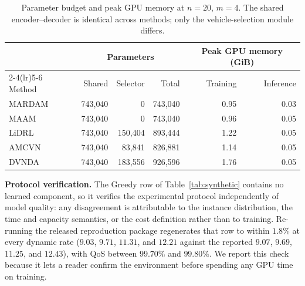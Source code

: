\begin{table}[t]
\centering
\caption{Parameter budget and peak GPU memory at $n=20$, $m=4$. The shared
encoder--decoder is identical across methods; only the vehicle-selection module
differs.}
\label{tab:budget}
\begin{tabular}{lrrrrr}
\toprule
& \multicolumn{3}{c}{Parameters} & \multicolumn{2}{c}{Peak GPU memory (GiB)} \\
\cmidrule(lr){2-4}\cmidrule(lr){5-6}
Method & Shared & Selector & Total & Training & Inference \\
\midrule
MARDAM & 743{,}040 & 0       & 743{,}040 & 0.95 & 0.03 \\
MAAM   & 743{,}040 & 0       & 743{,}040 & 0.96 & 0.05 \\
LiDRL  & 743{,}040 & 150{,}404 & 893{,}444 & 1.22 & 0.05 \\
AMCVN  & 743{,}040 & 83{,}841  & 826{,}881 & 1.14 & 0.05 \\
DVNDA  & 743{,}040 & 183{,}556 & 926{,}596 & 1.76 & 0.05 \\
\bottomrule
\end{tabular}
\end{table}



\textbf{Protocol verification.} The Greedy row of
Table~\ref{tab:synthetic} contains no learned component, so it verifies the
experimental protocol independently of model quality: any disagreement is
attributable to the instance distribution, the time and capacity semantics, or
the cost definition rather than to training. Re-running the released
reproduction package regenerates that row to within $1.8\%$ at every dynamic
rate ($9.03$, $9.71$, $11.31$, and $12.21$ against the reported $9.07$, $9.69$,
$11.25$, and $12.43$), with QoS between $99.70\%$ and $99.80\%$. We report this
check because it lets a reader confirm the environment before spending any GPU
time on training.



